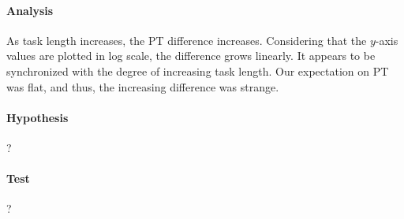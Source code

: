 \documentclass[10pt]{article}
\begin{document}
\paragraph{Analysis} As task length increases, the PT difference increases. 
Considering that the $y$-axis values are plotted in log scale, the difference grows linearly. 
It appears to be synchronized with the degree of increasing task length. 
Our expectation on PT was flat, and thus, the increasing difference was strange. 

\paragraph{Hypothesis} ?

\paragraph{Test} ?


%
%
%

%
%
\end{document}
